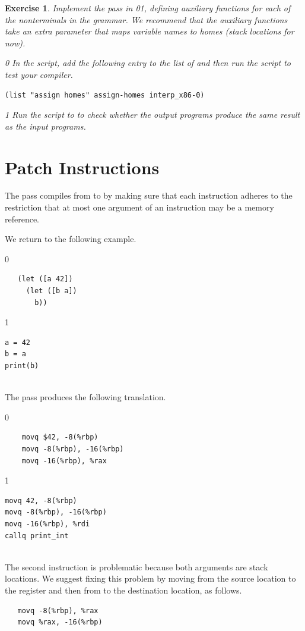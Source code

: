 \documentclass[7x10]{TimesAPriori_MIT}%
\def\racketEd{0}
\def\pythonEd{1}
\def\edition{0}
\newcommand{\racket}[1]{{\if\edition\racketEd{#1}\fi}}
\newcommand{\python}[1]{{\if\edition\pythonEd #1\fi}}
\newtheorem{exercise}[theorem]{Exercise}
\numberwithin{theorem}{chapter}
\numberwithin{definition}{chapter}
\numberwithin{equation}{chapter}
\begin{document}

\begin{exercise}\normalfont\normalsize
Implement the  pass in
\racket{}\python{}, defining
auxiliary functions for each of the nonterminals in the \LangXVar{}
grammar.  We recommend that the auxiliary functions take an extra
parameter that maps variable names to homes (stack locations for now).
%
{\if\edition\racketEd
In the  script, add the following entry to the
list of  and then run the script to test your compiler.
\begin{lstlisting}
(list "assign homes" assign-homes interp_x86-0)
\end{lstlisting}
\fi}
{\if\edition\pythonEd
Run the  script to to check
whether the output programs produce the same result as the input
programs.
\fi}
\end{exercise}


\section{Patch Instructions}
\label{sec:patch-s0}

The  pass compiles from \LangXVar{} to
\LangXInt{} by making sure that each instruction adheres to the
restriction that at most one argument of an instruction may be a
memory reference.

We return to the following example.\\
\begin{minipage}{0.5\textwidth}
{\if\edition\racketEd
\begin{lstlisting}
   (let ([a 42])
     (let ([b a])
       b))
\end{lstlisting}
\fi}
{\if\edition\pythonEd
\begin{lstlisting}
a = 42
b = a
print(b)
\end{lstlisting}
\fi}
\end{minipage}\\
The  pass produces the following translation. \\
\begin{minipage}{0.5\textwidth}
{\if\edition\racketEd
\begin{lstlisting}
    movq $42, -8(%rbp)
    movq -8(%rbp), -16(%rbp)
    movq -16(%rbp), %rax
\end{lstlisting}
\fi}
{\if\edition\pythonEd
\begin{lstlisting}
movq 42, -8(%rbp)
movq -8(%rbp), -16(%rbp)
movq -16(%rbp), %rdi
callq print_int
\end{lstlisting}
\fi}
\end{minipage}\\
The second  instruction is problematic because both
arguments are stack locations. We suggest fixing this problem by
moving from the source location to the register  and then
from  to the destination location, as follows.
\begin{lstlisting}
   movq -8(%rbp), %rax
   movq %rax, -16(%rbp)
\end{lstlisting}
\end{document}
